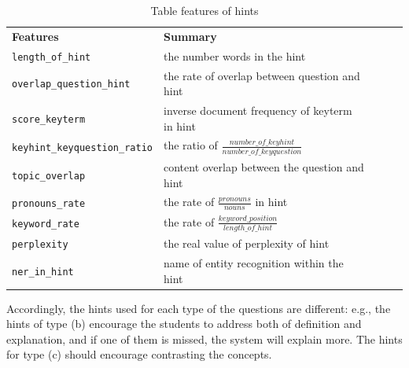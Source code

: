 \documentclass[letterpaper%
, twoside%
, 12pt%
,these%
, english%
,creativecommons,hyperref, withAlgo2e %
]{thETS}
\newcommand{\code}[1]{{\texttt{#1}}}
\begin{document}
\begin{table}[]
	\begin{tabular}{|l|l|lll}
		\cline{1-2}
		\textbf{Features}             & \textbf{Summary}              &  &  &  \\ \cline{1-2}
		\code{length\_of\_hint}  & the number words in the hint     &  &  &  \\ \cline{1-2}
		\code{overlap\_question\_hint} & the rate of overlap between question and hint &  &  &  \\ \cline{1-2}
		\code{score\_keyterm}          & inverse document frequency of keyterm in hint          & &  &  \\ \cline{1-2}
		\code{keyhint\_keyquestion\_ratio}          & the ratio of $\frac{number\_of\_keyhint}{number\_of\_keyquestion}$     &  &  &  \\ \cline{1-2}
		\code{topic\_overlap}          & content overlap between the question and hint     &  &  &  \\ \cline{1-2}
		
		\code{pronouns\_rate}          &  the rate of $\frac{pronouns}{nouns}$ in hint  & &  &  \\ \cline{1-2}
		\code{keyword\_rate}          &  the rate of $\frac{keyword\_position}{length\_of\_hint}$  & &  &  \\ \cline{1-2}
		\code{perplexity}          & the real value of perplexity of hint  & &  &  \\ \cline{1-2}
		\code{ner\_in\_hint}          & name of entity recognition within the hint        & &  &  \\ \cline{1-2}
	\end{tabular}
	\caption{Table features of hints}
	\label{tab:3}
\end{table}

Accordingly, the hints used for each type of the questions are different: e.g., the hints of type (b) encourage the students to address both of definition and explanation, and if one of them is missed, the system will explain more. The hints for type (c) should encourage contrasting the concepts.
\end{document}
